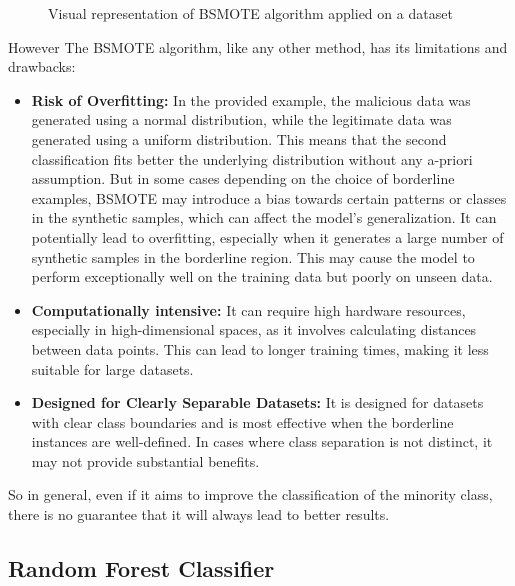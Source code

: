 \begin{figure}[H]
\begin{subfigure}{0.45\linewidth}
    \caption{}
    \label{fig:bordSMOTEApplied}
  \end{subfigure}
  \caption{Visual representation of BSMOTE algorithm applied on a dataset}
\end{figure}

However The BSMOTE algorithm, like any other method, has its limitations and drawbacks:
\begin{itemize}
  \item \textbf{Risk of Overfitting:} In the provided example, the malicious data was generated using a normal distribution, while the legitimate data was generated using a uniform distribution.
  This means that the second classification fits better the underlying distribution without any a-priori assumption.
  But in some cases depending on the choice of borderline examples, 
  BSMOTE may introduce a bias towards certain patterns or classes in the synthetic samples, which can affect the model's generalization.
  It can potentially lead to overfitting, especially when it generates a large number of synthetic samples in the borderline region. 
  This may cause the model to perform exceptionally well on the training data but poorly on unseen data.
  \item \textbf{Computationally intensive:} It can require high hardware resources, especially in high-dimensional spaces, as it involves calculating distances between data points. 
  This can lead to longer training times, making it less suitable for large datasets.
  \item \textbf{Designed for Clearly Separable Datasets:} It is designed for datasets with clear class boundaries and is most effective when the borderline instances are well-defined. 
  In cases where class separation is not distinct, it may not provide substantial benefits.
\end{itemize}
So in general, even if it aims to improve the classification of the minority class, there is no guarantee that it will always lead to better results.

\subsection{Random Forest Classifier}
\label{subsec:RF}

